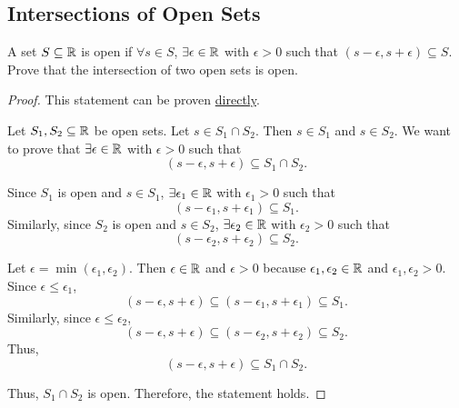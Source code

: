\subsection{Intersections of Open Sets}
\label{subsections:examples:example6}



\begin{exercise}{
    A set $S \subseteq \mathbb{R}$ is open if $\forall s \in S$, %
    $\exists \epsilon \in \mathbb{R}$ with $\epsilon > 0$ such that %
    $(s - \epsilon, s + \epsilon) \subseteq S$. %
    Prove that the intersection of two open sets is open.
}
\end{exercise}



\begin{proof}{
    This statement can be proven %
    \hyperref[subsections:techniques:universal:direct]{directly}.

    \begin{panel}[Setup.]{
        Let $S_1, S_2 \subseteq \mathbb{R}$ be open sets. %
        Let $s \in S_1 \cap S_2$. %
        Then $s \in S_1$ and $s \in S_2$. %
        We want to prove that %
        $\exists \epsilon \in \mathbb{R}$ with $\epsilon > 0$ such that %
        \[
            (s - \epsilon, s + \epsilon) \subseteq S_1 \cap S_2.
        \]
    }
    \end{panel}

    \begin{panel}{
        Since $S_1$ is open and $s \in S_1$, %
        $\exists \epsilon_1 \in \mathbb{R}$ with $\epsilon_1 > 0$ such that %
        \[
            (s - \epsilon_1, s + \epsilon_1) \subseteq S_1.
        \]
        Similarly, since $S_2$ is open and $s \in S_2$, %
        $\exists \epsilon_2 \in \mathbb{R}$ with $\epsilon_2 > 0$ such that %
        \[
            (s - \epsilon_2, s + \epsilon_2) \subseteq S_2.
        \]
    }
    \end{panel}

    \begin{panel}{
        Let $\epsilon = \min(\epsilon_1, \epsilon_2)$. %
        Then $\epsilon \in \mathbb{R}$ and $\epsilon > 0$ because %
        $\epsilon_1, \epsilon_2 \in \mathbb{R}$ and $\epsilon_1, \epsilon_2 > 0$. %
        Since $\epsilon \le \epsilon_1$, %
        \[
            (s - \epsilon, s + \epsilon) \subseteq
            (s - \epsilon_1, s + \epsilon_1) \subseteq S_1.
        \]
        Similarly, since $\epsilon \le \epsilon_2$, %
        \[
            (s - \epsilon, s + \epsilon) \subseteq
            (s - \epsilon_2, s + \epsilon_2) \subseteq S_2.
        \]
        Thus, %
        \[
            (s - \epsilon, s + \epsilon) \subseteq S_1 \cap S_2.
        \]
    }
    \end{panel}

    Thus, $S_1 \cap S_2$ is open. %
    Therefore, the statement holds.
}
\end{proof}